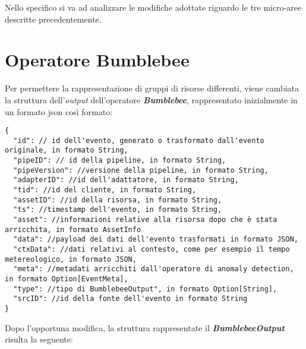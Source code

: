 Nello specifico si va ad analizzare le modifiche adottate riguardo le tre micro-aree descritte precedentemente.


\section{Operatore Bumblebee}\label{sec:bbout}
Per permettere la rappresentazione di gruppi di risorse differenti, viene cambiata la struttura dell'\textit{output} dell'operatore \textbf{\textit{Bumblebee}}, rappresentato inizialmente in un formato \gls{json} così formato:

\begin{verbatim}
{
  "id": // id dell'evento, generato o trasformato dall'evento originale, in formato String,
  "pipeID": // id della pipeline, in formato String,
  "pipeVersion": //versione della pipeline, in formato String,
  "adapterID": //id dell'adattatore, in formato String,
  "tid": //id del cliente, in formato String,
  "assetID": //id della risorsa, in formato String,
  "ts": //timestamp dell'evento, in formato String,
  "asset": //informazioni relative alla risorsa dopo che è stata arricchita, in formato AssetInfo
  "data": //payload dei dati dell'evento trasformati in formato JSON,
  "ctxData": //dati relativi al contesto, come per esempio il tempo metereologico, in formato JSON,
  "meta": //metadati arricchiti dall'operatore di anomaly detection, in formato Option[EventMeta],
  "type": //tipo di BumblebeeOutput", in formato Option[String],
  "srcID": //id della fonte dell'evento in formato String
}
\end{verbatim}

Dopo l'opportuna modifica, la struttura rappresentate il \textbf{\textit{BumblebeeOutput}} risulta la seguente:

